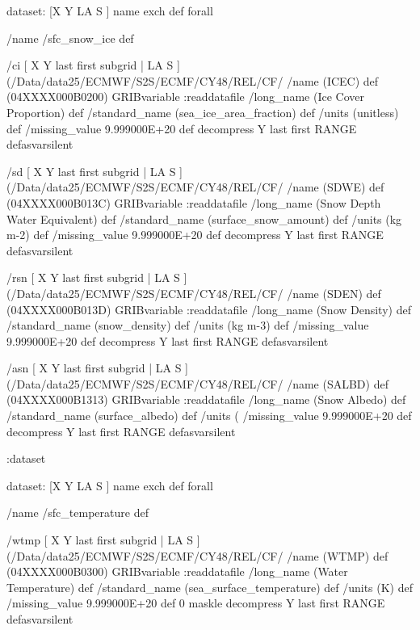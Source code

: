 \begin{ingrid}

dataset:
[X Y LA S ] {name exch def } forall

/name /sfc_snow_ice def

/ci { [ X Y last first subgrid | LA S ] (/Data/data25/ECMWF/S2S/ECMF/CY48/REL/CF/%
/name (ICEC) def
(04XXXX000B0200) GRIBvariable
:readdatafile
/long_name (Ice Cover Proportion) def
/standard_name (sea_ice_area_fraction) def
/units (unitless) def
/missing_value 9.999000E+20 def
decompress
Y last first RANGE
} defasvarsilent

/sd { [ X Y last first subgrid | LA S ] (/Data/data25/ECMWF/S2S/ECMF/CY48/REL/CF/%
/name (SDWE) def
(04XXXX000B013C) GRIBvariable
:readdatafile
/long_name (Snow Depth Water Equivalent) def
/standard_name (surface_snow_amount) def 
/units (kg m-2) def
/missing_value 9.999000E+20 def
decompress
Y last first RANGE
} defasvarsilent

/rsn { [ X Y last first subgrid | LA S ] (/Data/data25/ECMWF/S2S/ECMF/CY48/REL/CF/%
/name (SDEN) def
(04XXXX000B013D) GRIBvariable
:readdatafile
/long_name (Snow Density) def
/standard_name (snow_density) def
/units (kg m-3) def
/missing_value 9.999000E+20 def
decompress
Y last first RANGE
} defasvarsilent

/asn { [ X Y last first subgrid | LA S ] (/Data/data25/ECMWF/S2S/ECMF/CY48/REL/CF/%
/name (SALBD) def
(04XXXX000B1313) GRIBvariable
:readdatafile
/long_name (Snow Albedo) def
/standard_name (surface_albedo) def
/units (%
/missing_value 9.999000E+20 def
decompress
Y last first RANGE
} defasvarsilent

:dataset

dataset:
[X Y LA S ] {name exch def } forall

/name /sfc_temperature def

/wtmp { [ X Y last first subgrid | LA S ] (/Data/data25/ECMWF/S2S/ECMF/CY48/REL/CF/%
/name (WTMP) def
(04XXXX000B0300) GRIBvariable
:readdatafile
/long_name (Water Temperature) def
/standard_name (sea_surface_temperature) def
/units (K) def
/missing_value 9.999000E+20 def
0 maskle
decompress
Y last first RANGE
} defasvarsilent


\end{ingrid}
